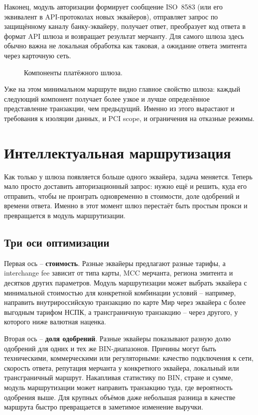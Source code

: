 Наконец, модуль авторизации формирует сообщение ISO~8583
(или его эквивалент в API-протоколах новых эквайеров),
отправляет запрос по защищённому каналу банку-эквайеру,
получает ответ, преобразует код ответа в формат API шлюза
и возвращает результат мерчанту. Для самого шлюза здесь обычно
важна не локальная обработка как таковая, а ожидание ответа
эмитента через карточную сеть.

\begin{figure}[tbp]
  \centering
  \caption{Компоненты платёжного шлюза.}
  \label{fig:gateway-components}
\end{figure}

Уже на этом минимальном маршруте видно главное свойство шлюза:
каждый следующий компонент получает более узкое и лучше
определённое представление транзакции, чем предыдущий. Именно
из этого вырастают и требования к изоляции данных, и PCI scope,
и ограничения на отказные режимы.

\section{Интеллектуальная маршрутизация}
\label{sec:gw-routing}

Как только у шлюза появляется больше одного эквайера, задача
меняется. Теперь мало просто доставить авторизационный запрос:
нужно ещё и решить, куда его отправить, чтобы не проиграть
одновременно в стоимости, доле одобрений и времени ответа.
Именно в этот момент шлюз перестаёт быть простым прокси
и превращается в модуль маршрутизации.

\subsection*{Три оси оптимизации}

Первая ось -- \textbf{стоимость}. Разные эквайеры предлагают
разные тарифы, а interchange fee зависит от типа карты,
MCC мерчанта, региона эмитента и десятков других параметров.
Модуль маршрутизации может выбрать эквайера с минимальной
стоимостью для конкретной комбинации условий -- например,
направить внутрироссийскую транзакцию по карте Мир через
эквайера с более выгодным тарифом НСПК, а трансграничную
транзакцию -- через другого, у которого ниже валютная
наценка.

Вторая ось -- \textbf{доля одобрений}. Разные эквайеры
показывают разную долю одобрений для одних и тех же BIN-диапазонов.
Причины могут быть техническими, коммерческими или регуляторными:
качество подключения к сети, скорость ответа, репутация мерчанта
у конкретного эквайера, локальный или трансграничный маршрут.
Накапливая статистику по BIN, стране и сумме, модуль маршрутизации
может направить транзакцию туда, где вероятность одобрения выше.
Для крупных объёмов даже небольшая разница в качестве маршрута
быстро превращается в заметимое изменение выручки.

